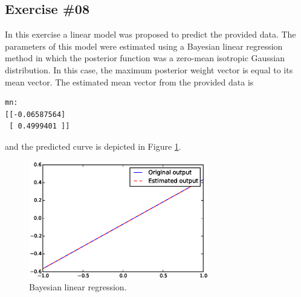 \documentclass[a4paper,12pt]{article}
\begin{document}
\cleardoublepage
\subsection*{Exercise \#08}
In this exercise a linear model was proposed to predict the provided data. The parameters of this model were estimated using a Bayesian linear regression method in which the posterior function was a zero-mean isotropic Gaussian distribution. In this case, the maximum posterior weight vector is equal to its mean vector. The estimated mean vector from the provided data is
\begin{verbatim}
mn:
[[-0.06587564]
 [ 0.4999401 ]]
\end{verbatim}
and the predicted curve is depicted in Figure \ref{fig:8f1}.
\begin{figure}[htb]
 \centering
 \includegraphics[width=0.7\textwidth]{./figures/8f1.eps}
 \caption{Bayesian linear regression.}
 \label{fig:8f1}
\end{figure}
\end{document}
